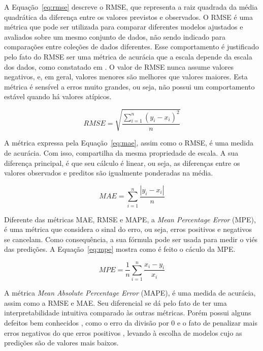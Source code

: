 A Equação~\ref{eq:rmse} descreve o RMSE, que representa a raiz quadrada da média quadrática da diferença entre os valores previstos e observados. O RMSE é uma métrica que pode ser utilizada para comparar diferentes modelos ajustados e avaliados sobre um mesmo conjunto de dados, não sendo indicado para comparações entre coleções de dados diferentes. Esse comportamento é justificado pelo fato do RMSE ser uma métrica de acurácia que a escala depende da escala dos dados, como constatado em \cite{HYNDMAN2006679}. O valor de RMSE nunca assume valores negativos, e, em geral, valores menores são melhores que valores maiores. Esta métrica é sensível a erros muito grandes, ou seja, não possui um comportamento estável quando há valores atípicos.

\begin{equation} \label{eq:rmse}
    RMSE=\sqrt{\dfrac{\sum ^{n}_{i=1}\left( y_{i}-x_{i}\right) ^{2}}{n}}
\end{equation}

A métrica expressa pela Equação~\ref{eq:mae}, assim como o RMSE, é uma medida de acurácia. Com isso, compartilha da mesma propriedade de escala. A sua diferença principal, é que seu cálculo é linear, ou seja, as diferenças entre os valores observados e preditos são igualmente ponderadas na média.

\begin{equation} \label{eq:mae}
    MAE=\sum ^{n}_{i=1}\dfrac{\left| y_{i}-x_{i}\right| }{n}
\end{equation}

Diferente das métricas MAE, RMSE e MAPE, a \textit{Mean Percentage Error} (MPE), é uma métrica que considera o sinal do erro, ou seja, erros positivos e negativos se cancelam. Como consequência, a sua fórmula pode ser usada para medir o viés das predições. A Equação~\ref{eq:mpe} mostra como é feito o cáculo da MPE.

\begin{equation} \label{eq:mpe}
    MPE=\dfrac{1}{n}\sum ^{n}_{i=1}\dfrac{x_{i}-y_{i}}{x_{i}}
\end{equation}

A métrica \textit{Mean Absolute Percentage Error} (MAPE), é uma medida de acurácia, assim como a RMSE e MAE. Seu diferencial se dá pelo fato de ter uma interpretabilidade intuitiva comparado às outras métricas. Porém possui alguns defeitos bem conhecidos \cite{CHRISTOFALLIS2015}, como o erro da divisão por 0 e o fato de penalizar mais erros negativos do que erros positivos \cite{MAKRIDAKIS1993527}, levando à escolha de modelos cujo as predições são de valores mais baixos.

